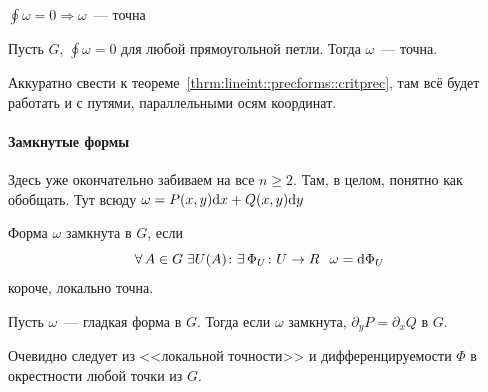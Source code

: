 \documentclass[12pt,timbord]{../../../notes}
\begin{document}
\begin{thrm}\label{thrm:lineint::precforms::critprecloop}
  $\displaystyle \oint \omega =0 \Rightarrow \omega$~--- точна
\end{thrm}

\begin{thrm}\label{thrm:lineint::precforms::precrecloop}
  Пусть $G$, $\oint \omega =0 $ для любой прямоугольной петли. Тогда $\omega$~--- точна.
\end{thrm}
\begin{ittproof}
  Аккуратно свести к теореме~\ref{thrm:lineint::precforms::critprec}, там всё будет работать и с
  путями, параллельными осям координат.
\end{ittproof}

\paragraph{Замкнутые формы}
\label{par:lineint::closforms}
Здесь уже окончательно забиваем на все $n \geqslant 2$. Там, в целом, понятно как обобщать.
Тут всюду $\omega =  P(x,y) \mathrm{d} x + Q(x,y) \mathrm{d} y$
\begin{defn}\label{defn:lineint::closforms::closform}
  Форма $\omega$ замкнута в $G$, если
  \[
    \forall\, A \in G \; \exists U (A) \colon \exists\, \Phi_U\colon U\to R \;\:\: \omega = \mathrm{d}
    \Phi_U
  \]
  короче, локально точна.
\end{defn}

\begin{thrm}\label{thrm:lineint::closforms::nessdiff}
  Пусть $\omega$~--- гладкая форма в $G$. Тогда если $\omega$ замкнута,
  $\partial_y P = \partial_x Q$ в $G$.
\end{thrm}
\begin{ittproof}
  Очевидно следует из <<локальной точности>> и дифференцируемости $\Phi$ в окрестности любой точки из $G$.
\end{ittproof}
\end{document}
